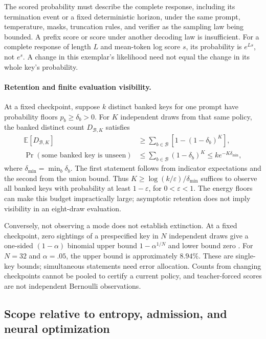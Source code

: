 \documentclass{article}
\newcommand{\1}{\mathbf 1}
\theoremstyle{remark}
\theoremstyle{definition}
\theoremstyle{plain}
\begin{document}
The scored probability must describe the complete response, including its
termination event or a fixed deterministic horizon, under the same prompt,
temperature, masks, truncation rules, and verifier as the sampling law being
bounded. A prefix score or score under another decoding law is insufficient.
For a complete response of length $L$ and mean-token log score $s$, its
probability is $e^{Ls}$, not $e^s$. A change in this exemplar's likelihood
need not equal the change in its whole key's probability.

\paragraph{Retention and finite evaluation visibility.}
At a fixed checkpoint, suppose $k$ distinct banked keys for one prompt have
probability floors $p_b\ge\delta_b>0$. For $K$ independent draws from that
same policy, the banked distinct count $D_{\mathcal B,K}$ satisfies
\[
 \begin{aligned}
 \mathbb E[D_{\mathcal B,K}]
 &\ge\sum_{b\in\mathcal B}\left[1-(1-\delta_b)^K\right],\\
 \Pr(\text{some banked key is unseen})
 &\le\sum_{b\in\mathcal B}(1-\delta_b)^K
 \le k e^{-K\delta_{\min}},
 \end{aligned}
\]
where $\delta_{\min}=\min_b\delta_b$. The first statement follows from
indicator expectations and the second from the union bound. Thus
$K\ge\log(k/\varepsilon)/\delta_{\min}$ suffices to observe all banked keys
with probability at least $1-\varepsilon$, for $0<\varepsilon<1$.
The energy floors can make this budget impractically large; asymptotic
retention does not imply visibility in an eight-draw evaluation.

Conversely, not observing a mode does not establish extinction. At a fixed
checkpoint, zero sightings of a prespecified key in $N$ independent draws
give a one-sided $(1-\alpha)$ binomial upper bound
$1-\alpha^{1/N}$ and lower bound zero \citep{clopper1934binomial}. For
$N=32$ and $\alpha=.05$, the upper bound is approximately $8.94\%$.
These are single-key bounds; simultaneous statements need error allocation.
Counts from changing checkpoints cannot be pooled to certify a current
policy, and teacher-forced scores are not independent Bernoulli observations.

\subsection{Scope relative to entropy, admission, and neural optimization}
\label{app:theory-entropy}
\label{app:theory-entropy-comparison}
\end{document}
